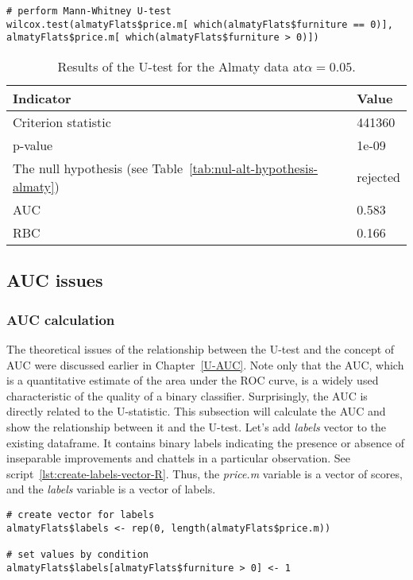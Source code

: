 \documentclass[]{scrreprt}
\begin{document}
%
\begin{lstlisting}[float=htp, caption = Running a U-test for data from the city of Almaty., firstnumber=1, label= lst:U-test-R]
# perform Mann-Whitney U-test
wilcox.test(almatyFlats$price.m[ which(almatyFlats$furniture == 0)],
almatyFlats$price.m[ which(almatyFlats$furniture > 0)]) 
\end{lstlisting}
%
\begin{table}[htp]
	\caption{Results of the U-test for the Almaty data at$\alpha=0.05$.}\label{tab:u-test-r-result}
	\centering
	\begin{tabular}{ll}
		\hline
		Indicator&Value\\
		\hline
		Criterion statistic&441360\\
		\hline
		p-value&1e-09\\
		\hline
		The null hypothesis (see Table~\ref{tab:nul-alt-hypothesis-almaty})&rejected\\
		\hline
		AUC&0.583\\
		\hline
		RBC&0.166\\
		\hline
	\end{tabular}
\end{table}
%
\subsection{AUC issues}
\subsubsection{AUC calculation}\label{AUC-almaty}
The theoretical issues of the relationship between the U-test and the concept of AUC were discussed earlier in Chapter~\ref{U-AUC}. Note only that the AUC, which is a quantitative estimate of the area under the ROC curve, is a widely used characteristic of the quality of a binary classifier. Surprisingly, the AUC is directly related to the U-statistic. This subsection will calculate the AUC and show the relationship between it and the U-test. Let's add \textit{labels} vector to the existing dataframe. It contains binary labels indicating the presence or absence of inseparable improvements and chattels in a particular observation. See script~\ref{lst:create-labels-vector-R}. Thus, the \textit{price.m} variable is a vector of scores, and the \textit{labels} variable is a vector of labels.
%
\begin{lstlisting}[float=htp, caption = Adding a variable with binary labels. firstnumber=1, label= lst:create-labels-vector-R]
# create vector for labels
almatyFlats$labels <- rep(0, length(almatyFlats$price.m))

# set values by condition
almatyFlats$labels[almatyFlats$furniture > 0] <- 1
\end{lstlisting}
%
\end{document}
